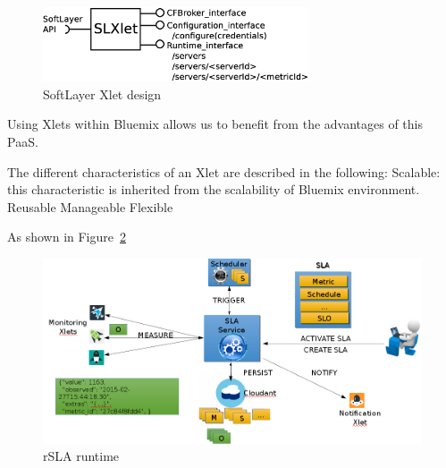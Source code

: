 \begin{figure}[H]
\centering
\hspace{1.5cm}
\includegraphics[width=0.7\textwidth]{pics/SLXlet}
\caption{\label{fig:slxlet} SoftLayer Xlet design}
\end{figure}
Using Xlets within Bluemix allows us to benefit from the advantages of this PaaS. 

The different characteristics of an Xlet are described in the following:
Scalable: this characteristic is inherited from the scalability of Bluemix environment.
Reusable 
Manageable
Flexible



As shown in Figure~\ref{fig:runtime}
\begin{figure}[H]
\centering
\includegraphics[width=\textwidth]{pics/runtime.png}
\caption{\label{fig:runtime} rSLA runtime}
\end{figure}